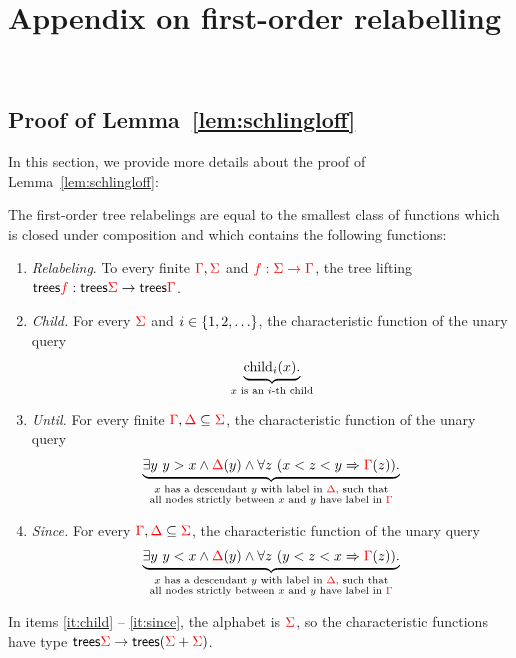 \section{Appendix on first-order relabelling}~\label{sec:AppendixForat}

\subsection{Proof of Lemma~\ref{lem:schlingloff}}

In this section, we provide more details about the proof of Lemma~\ref{lem:schlingloff}:

\begin{lemma} The first-order tree relabelings are equal to the smallest class of functions which is closed under composition and which  contains the following functions:
    \begin{enumerate}
        \item \label{it:relabeling} \emph{Relabeling}. To every finite ${\color{red}{\Gamma}},{\color{red}{\Sigma}}$ and ${\color{red}{f : {\color{red}{\Sigma}}\to {\color{red}{\Gamma}}}}$, the tree lifting $\mathsf {trees} {\color{red}{f}} : \mathsf {trees} {\color{red}{\Sigma}} \to \mathsf {trees} {\color{red}{\Gamma}}$.
        \item \label{it:child} \emph{Child.} For every ${\color{red}{\Sigma}}$ and  $i \in \{1,2,\ldots\}$, the characteristic function of the  unary query 
        \begin{align*}
            \underbrace{\mathrm{child}_{i} (x).}_{\text{$x$ is an $i$-th child}}
        \end{align*}
         \item \label{it:until} \emph{Until.} For every finite ${\color{red}{\Gamma}}, {\color{red}{\Delta}} \subseteq {\color{red}{\Sigma}}$,  the characteristic function of the unary query
         \begin{align*}
              \underbrace{\exists y\ y > x \land {\color{red}{\Delta}}(y) \land  \forall z \ (x < z < y \Rightarrow {\color{red}{\Gamma}}(z)).}_{\substack{\text{$x$ has a descendant $y$ with label in ${\color{red}{\Delta}}$, such that}\\ \text{all nodes strictly between $x$ and $y$ have label in ${\color{red}{\Gamma}}$}}} 
         \end{align*} 
         \item \label{it:since}\emph{Since.} For every ${\color{red}{\Gamma}}, {\color{red}{\Delta}} \subseteq {\color{red}{\Sigma}}$,    the characteristic function of the unary query
         \begin{align*}
              \underbrace{\exists y\ y < x \land {\color{red}{\Delta}}(y) \land  \forall z \ (y < z < x \Rightarrow {\color{red}{\Gamma}}(z)).}_{\substack{\text{$x$ has a descendant $y$ with label in ${\color{red}{\Delta}}$, such that}\\ \text{all nodes strictly between $x$ and $y$ have label in ${\color{red}{\Gamma}}$}}}  
         \end{align*} 
    \end{enumerate}
    In items \ref{it:child} -- \ref{it:since}, the alphabet is ${\color{red}{\Sigma}}$, so the characteristic functions have type $\mathsf {trees} {\color{red}{\Sigma}} \to \mathsf {trees}({\color{red}{\Sigma}} + {\color{red}{\Sigma}})$. 
\end{lemma}
